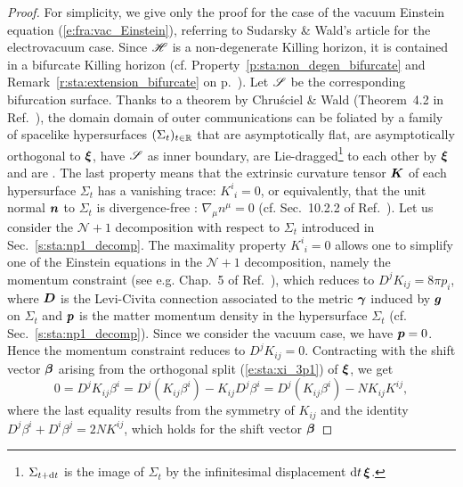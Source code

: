 \begin{proof}
For simplicity, we give only the proof for the case of the vacuum Einstein equation
(\ref{e:fra:vac_Einstein}), referring
to Sudarsky \& Wald's article \cite{SudarW93} for the electrovacuum case.
Since $\mathscr{H}$ is a non-degenerate Killing horizon, it is contained in a bifurcate Killing horizon
(cf. Property~\ref{p:sta:non_degen_bifurcate} and Remark~\ref{r:sta:extension_bifurcate} on p.~\pageref{r:sta:extension_bifurcate}).
Let $\mathscr{S}$ be the corresponding bifurcation surface.
Thanks to a theorem by Chru\'sciel \&
Wald (Theorem~4.2 in Ref.~\cite{ChrusW94a}),
the domain domain of outer communications can be foliated by a family of
spacelike hypersurfaces $(\Sigma_t)_{t\in\mathbb{R}}$
that are asymptotically flat, are asymptotically orthogonal to $\bm{\xi}$,
have $\mathscr{S}$ as inner boundary, are Lie-dragged\footnote{$\Sigma_{t+\mathrm{d} t}$ is the image of $\Sigma_t$ by the infinitesimal displacement $\mathrm{d} t\, \bm{\xi}$.}
to each other by $\bm{\xi}$ and are .
The last property means that the
extrinsic curvature
tensor $\bm{K}$ of each hypersurface $\Sigma_t$
has a vanishing trace: $K^i_{\ \, i} = 0$, or equivalently, that
the unit normal $\bm{n}$ to $\Sigma_t$ is divergence-free : $\nabla_\mu n^\mu = 0$
(cf. Sec.~10.2.2 of Ref.~\cite{Gourg12}).
Let us consider the $\mathcal{N}+1$ decomposition with respect to $\Sigma_t$
introduced in Sec.~\ref{s:sta:np1_decomp}.
The maximality property $K^i_{\ \, i} = 0$ allows one
to simplify one of the Einstein equations in the $\mathcal{N}+1$ decomposition,
namely the momentum constraint (see e.g. Chap.~5 of Ref.~\cite{Gourg12}),
which reduces to $D^j K_{ij} = 8\pi p_i$, where $\bm{D}$ is the Levi-Civita connection
associated to the metric $\bm{\gamma}$ induced by $\bm{g}$ on $\Sigma_t$ and $\bm{p}$ is the matter momentum density in the hypersurface $\Sigma_t$ (cf. Sec.~\ref{s:sta:np1_decomp}).
Since we consider the vacuum case, we have $\bm{p} = 0$. Hence the momentum
constraint reduces to $D^j K_{ij} = 0$. Contracting with the shift vector $\bm{\beta}$
arising from the orthogonal split (\ref{e:sta:xi_3p1}) of $\bm{\xi}$, we get
\[
    0 = D^j K_{ij} \beta^i
    =  D^j \left( K_{ij} \beta^i \right) - K_{ij} D^j \beta^i
     =  D^j \left( K_{ij} \beta^i \right) - N K_{ij} K^{ij}   ,
\]
where the last equality results from the symmetry of $K_{ij}$ and the identity
$D^j \beta^i + D^i \beta^j = 2N K^{ij}$, which holds for the shift vector $\bm{\beta}$

\end{proof}
